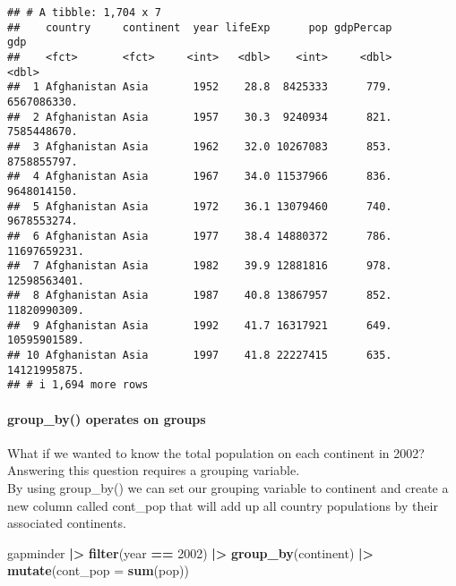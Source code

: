 \documentclass[
]{article}
\newenvironment{Shaded}{\begin{snugshade}}{\end{snugshade}}
\newcommand{\AttributeTok}[1]{\textcolor[rgb]{0.13,0.29,0.53}{#1}}
\newcommand{\DecValTok}[1]{\textcolor[rgb]{0.00,0.00,0.81}{#1}}
\newcommand{\FunctionTok}[1]{\textcolor[rgb]{0.13,0.29,0.53}{\textbf{#1}}}
\newcommand{\NormalTok}[1]{#1}
\newcommand{\SpecialCharTok}[1]{\textcolor[rgb]{0.81,0.36,0.00}{\textbf{#1}}}
\begin{document}
\begin{verbatim}
## # A tibble: 1,704 x 7
##    country     continent  year lifeExp      pop gdpPercap          gdp
##    <fct>       <fct>     <int>   <dbl>    <int>     <dbl>        <dbl>
##  1 Afghanistan Asia       1952    28.8  8425333      779.  6567086330.
##  2 Afghanistan Asia       1957    30.3  9240934      821.  7585448670.
##  3 Afghanistan Asia       1962    32.0 10267083      853.  8758855797.
##  4 Afghanistan Asia       1967    34.0 11537966      836.  9648014150.
##  5 Afghanistan Asia       1972    36.1 13079460      740.  9678553274.
##  6 Afghanistan Asia       1977    38.4 14880372      786. 11697659231.
##  7 Afghanistan Asia       1982    39.9 12881816      978. 12598563401.
##  8 Afghanistan Asia       1987    40.8 13867957      852. 11820990309.
##  9 Afghanistan Asia       1992    41.7 16317921      649. 10595901589.
## 10 Afghanistan Asia       1997    41.8 22227415      635. 14121995875.
## # i 1,694 more rows
\end{verbatim}

\paragraph{group\_by() operates on
groups}\label{group_by-operates-on-groups}

What if we wanted to know the total population on each continent in
2002? Answering this question requires a grouping variable.\\
By using group\_by() we can set our grouping variable to continent and
create a new column called cont\_pop that will add up all country
populations by their associated continents.

\begin{Shaded}
\begin{Highlighting}[]
\NormalTok{gapminder }\SpecialCharTok{|\textgreater{}}
 \FunctionTok{filter}\NormalTok{(year }\SpecialCharTok{==} \DecValTok{2002}\NormalTok{) }\SpecialCharTok{|\textgreater{}}
 \FunctionTok{group\_by}\NormalTok{(continent) }\SpecialCharTok{|\textgreater{}}
 \FunctionTok{mutate}\NormalTok{(}\AttributeTok{cont\_pop =} \FunctionTok{sum}\NormalTok{(pop))}
\end{Highlighting}
\end{Shaded}
\end{document}
